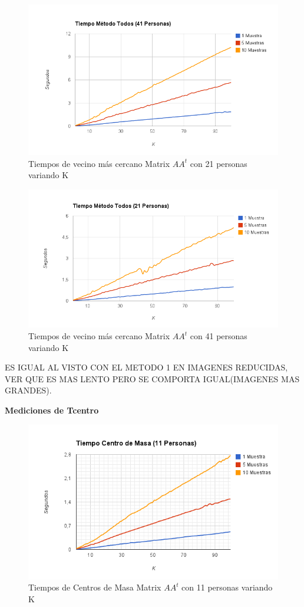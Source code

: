 \begin{figure}[H]
\includegraphics[width=1\textwidth]{img/imagef5.png}
     \caption{Tiempos de vecino más cercano Matrix $AA^t$ con 21 personas variando K}
\end{figure}

\begin{figure}[H]
\includegraphics[width=1\textwidth]{img/imagef6.png}
     \caption{Tiempos de vecino más cercano Matrix $AA^t$ con 41 personas variando K}
\end{figure}

ES IGUAL AL VISTO CON EL METODO 1 EN IMAGENES REDUCIDAS, VER QUE ES MAS LENTO PERO SE COMPORTA IGUAL(IMAGENES MAS GRANDES).

\textbf{Mediciones de Tcentro }

\begin{figure}[H]
\includegraphics[width=1\textwidth]{img/imagef7.png}
     \caption{Tiempos de Centros de Masa Matrix $AA^t$ con 11 personas variando K}
\end{figure}

